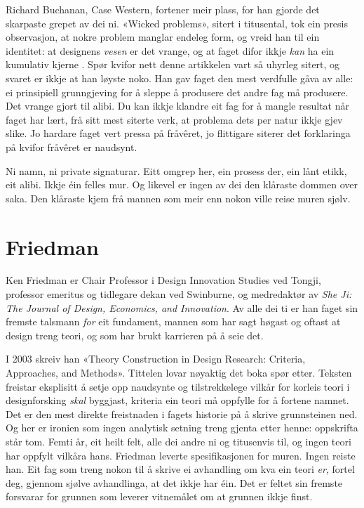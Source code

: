 Richard Buchanan, Case Western, fortener meir plass, for han gjorde det skarpaste grepet av dei ni. «Wicked problems», sitert i titusental, tok ein presis observasjon, at nokre problem manglar endeleg form, og vreid han til ein identitet: at designens \emph{vesen} er det vrange, og at faget difor ikkje \emph{kan} ha ein kumulativ kjerne \autocite{buchanan1992wicked,buchanan1995idea}. Spør kvifor nett denne artikkelen vart så uhyrleg sitert, og svaret er ikkje at han løyste noko. Han gav faget den mest verdfulle gåva av alle: ei prinsipiell grunngjeving for å sleppe å produsere det andre fag må produsere. Det vrange gjort til alibi. Du kan ikkje klandre eit fag for å mangle resultat når faget har lært, frå sitt mest siterte verk, at problema dets per natur ikkje gjev slike. Jo hardare faget vert pressa på fråvêret, jo flittigare siterer det forklaringa på kvifor fråvêret er naudsynt.

Ni namn, ni private signaturar. Eitt omgrep her, ein prosess der, ein lånt etikk, eit alibi. Ikkje éin felles mur. Og likevel er ingen av dei den klåraste dommen over saka. Den klåraste kjem frå mannen som meir enn nokon ville reise muren sjølv.

\section{Friedman}

Ken Friedman er Chair Professor i Design Innovation Studies ved Tongji, professor emeritus og tidlegare dekan ved Swinburne, og medredaktør av \textit{She Ji: The Journal of Design, Economics, and Innovation}. Av alle dei ti er han faget sin fremste talsmann \emph{for} eit fundament, mannen som har sagt høgast og oftast at design treng teori, og som har brukt karrieren på å seie det.

I 2003 skreiv han «Theory Construction in Design Research: Criteria, Approaches, and Methods». Tittelen lovar nøyaktig det boka spør etter. Teksten freistar eksplisitt å setje opp naudsynte og tilstrekkelege vilkår for korleis teori i designforsking \emph{skal} byggjast, kriteria ein teori må oppfylle for å fortene namnet. Det er den mest direkte freistnaden i fagets historie på å skrive grunnsteinen ned. Og her er ironien som ingen analytisk setning treng gjenta etter henne: oppskrifta står tom. Femti år, eit heilt felt, alle dei andre ni og titusenvis til, og ingen teori har oppfylt vilkåra hans. Friedman leverte spesifikasjonen for muren. Ingen reiste han. Eit fag som treng nokon til å skrive ei avhandling om kva ein teori \emph{er}, fortel deg, gjennom sjølve avhandlinga, at det ikkje har éin. Det er feltet sin fremste forsvarar for grunnen som leverer vitnemålet om at grunnen ikkje finst.

